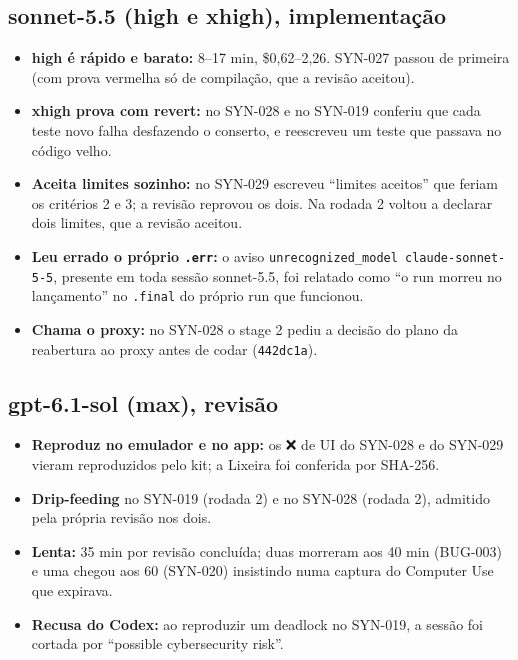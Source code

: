 \documentclass[11pt,a4paper]{article}
\begin{document}
\subsection*{sonnet-5.5 (high e xhigh), implementação}
\begin{itemize}
  \item \textbf{high é rápido e barato:} 8--17 min, \$0,62--2,26. SYN-027
        passou de primeira (com prova vermelha só de compilação, que a
        revisão aceitou).
  \item \textbf{xhigh prova com revert:} no SYN-028 e no SYN-019 conferiu que
        cada teste novo falha desfazendo o conserto, e reescreveu um teste que
        passava no código velho.
  \item \textbf{Aceita limites sozinho:} no SYN-029 escreveu ``limites
        aceitos'' que feriam os critérios 2 e 3; a revisão reprovou os dois. Na
        rodada 2 voltou a declarar dois limites, que a revisão aceitou.
  \item \textbf{Leu errado o próprio \texttt{.err}:} o aviso
        \texttt{unrecognized\_model claude-sonnet-5-5}, presente em toda sessão
        sonnet-5.5, foi relatado como ``o run morreu no lançamento'' no
        \texttt{.final} do próprio run que funcionou.
  \item \textbf{Chama o proxy:} no SYN-028 o stage 2 pediu a decisão do plano da
        reabertura ao proxy antes de codar (\texttt{442dc1a}).
\end{itemize}

\subsection*{gpt-6.1-sol (max), revisão}
\begin{itemize}
  \item \textbf{Reproduz no emulador e no app:} os ❌ de UI do SYN-028 e do
        SYN-029 vieram reproduzidos pelo kit; a Lixeira foi conferida por
        SHA-256.
  \item \textbf{Drip-feeding} no SYN-019 (rodada 2) e no SYN-028 (rodada 2),
        admitido pela própria revisão nos dois.
  \item \textbf{Lenta:} 35 min por revisão concluída; duas morreram aos 40 min
        (BUG-003) e uma chegou aos 60 (SYN-020) insistindo numa captura do
        Computer Use que expirava.
  \item \textbf{Recusa do Codex:} ao reproduzir um deadlock no SYN-019, a
        sessão foi cortada por ``possible cybersecurity risk''.
\end{itemize}
\end{document}
